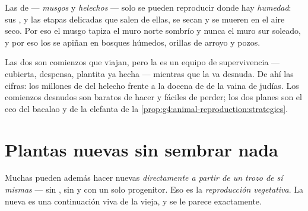 \begin{proposition}\label{prop:g4:plants-without-seeds:damp}
Las  de  --- \emph{musgos} y
\emph{helechos} --- solo se pueden reproducir donde hay
\emph{humedad}: sus , y las etapas delicadas que salen de
ellas, se secan y se mueren en el aire seco. Por eso el musgo
tapiza el muro norte sombrío y nunca el muro sur soleado, y por eso
los  se apiñan en bosques húmedos, orillas de arroyo y pozos.
\end{proposition}
\admitted

\begin{remark}\label{rem:g4:plants-without-seeds:sporeseed}
Las dos son comienzos que viajan, pero la  es un equipo de
supervivencia --- cubierta, despensa, plantita ya hecha --- mientras
que la  va desnuda. De ahí las cifras: los millones de 
del helecho frente a la docena de  de la vaina de judías. Los
comienzos desnudos son baratos de hacer y fáciles de perder; los dos
planes son el eco del bacalao y de la elefanta de la
\cref{prop:g4:animal-reproduction:strategies}.
\end{remark}

\section{Plantas nuevas sin sembrar nada}

\begin{definition}\label{def:g4:plants-without-seeds:vegetative}
Muchas  pueden además hacer  nuevas \emph{directamente a
partir de un trozo de sí mismas} --- sin , sin  y con
un solo progenitor. Eso es la \emph{reproducción
vegetativa}. La  nueva es una
continuación viva de la vieja, y se le parece exactamente.
\end{definition}

